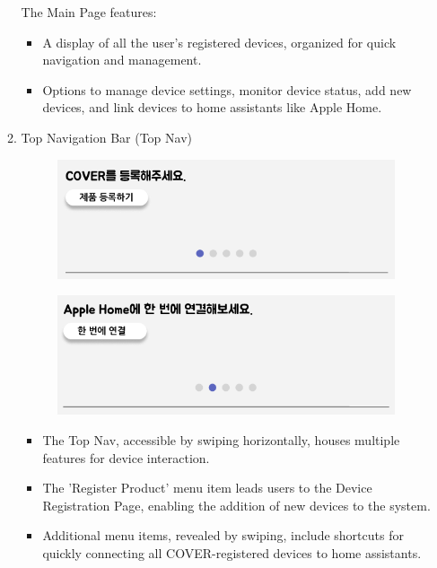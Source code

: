 \documentclass[conference]{IEEEtran}
\begin{document}
\begin{enumerate}[label=\arabic*.]
\begin{enumerate}[label=\alph*.]
The Main Page features:\\
\begin{itemize}
\item A display of all the user's registered devices, organized for quick navigation and management.\\
\item Options to manage device settings, monitor device status, add new devices, and link devices to home assistants like Apple Home.\\
\end{itemize}

\item Top Navigation Bar (Top Nav)\\
\begin{figure}[H]\centering \includegraphics[scale=0.5]{images/sw-spec-3.png}\end{figure}
\begin{figure}[H]\centering \includegraphics[scale=0.5]{images/sw-spec-4.png}\end{figure}
\begin{itemize}
\item The Top Nav, accessible by swiping horizontally, houses multiple features for device interaction.\\
\item The 'Register Product' menu item leads users to the Device Registration Page, enabling the addition of new devices to the system.\\
\item Additional menu items, revealed by swiping, include shortcuts for quickly connecting all COVER-registered devices to home assistants.\\
\end{itemize}


\end{enumerate}
\end{enumerate}
\end{document}
